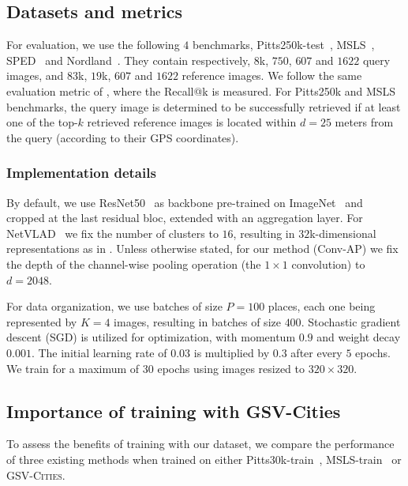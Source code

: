 \documentclass{article}
\begin{document}
\subsection{Datasets and metrics}\label{sec:exp:eval}
For evaluation, we use the following $4$ benchmarks,  Pitts250k-test~\cite{torii2013visual}, MSLS~\cite{warburg2020mapillary}, SPED~\cite{zaffar2021vpr} and Nordland~\cite{zaffar2021vpr}. They contain respectively, $8$k, $750$, $607$ and $1622$ query images, and $83$k, $19$k, $607$ and $1622$ reference images. We follow the same evaluation metric of \cite{arandjelovic2016netvlad, warburg2020mapillary, zaffar2021vpr}, where the Recall@k is measured. For Pitts250k and MSLS benchmarks, the query image is determined to be successfully retrieved if at least one of the top-$k$ retrieved reference images is located within $d = 25$ meters from the query (according to their GPS coordinates).

\subsubsection{Implementation details}
By default, we use ResNet50~\cite{he2016deep} as backbone pre-trained on ImageNet~\cite{russakovsky2015imagenet} and cropped at the last residual bloc, extended with an aggregation layer. For NetVLAD~\cite{arandjelovic2016netvlad} we fix the number of clusters to $16$, resulting in $32$k-dimensional representations as in \cite{arandjelovic2016netvlad, hausler2021patch}. Unless otherwise stated, for our method (Conv-AP) we fix the depth of the channel-wise pooling operation (the $1 {\times} 1$ convolution) to $d = 2048$.

For data organization, we use batches of size $P = 100$ places, each one being represented by $K = 4$ images, resulting in batches of size $400$. Stochastic gradient descent (SGD) is utilized for optimization, with momentum $0.9$ and weight decay $0.001$. The initial learning rate of $0.03$ is multiplied by $0.3$ after every $5$ epochs.  We train for a maximum of $30$ epochs using images resized to $320{\times} 320$.

\subsection{Importance of training with GSV-Cities}
\label{sec:exp:netvlad}
To assess the benefits of training with our dataset, we compare the performance of three existing methods when trained on either Pitts30k-train~\cite{torii2013visual}, MSLS-train~\cite{warburg2020mapillary} or \textsc{GSV-Cities}.
\end{document}
